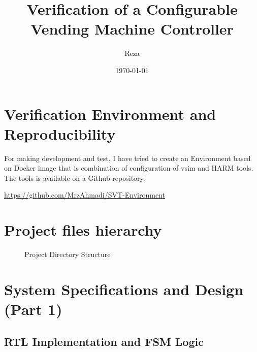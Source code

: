\documentclass[11pt]{article}
\title{Verification of a Configurable Vending Machine Controller}
\author{Reza}
\date{\today}
\begin{document}
\maketitle
\tableofcontents
\newpage

\section{Verification Environment and Reproducibility}
For making development and test, I have tried to create an Environment based on Docker image that is combination of configuration of vsim and HARM tools. The tools is available on a Github repository.
\begin{center}
    \url{https://github.com/MrzAhmadi/SVT-Environment}
\end{center}

\section{Project files hierarchy}
\begin{figure}[h]
    \centering
    \begin{minipage}{0.6\textwidth} %
    \end{minipage}
    \caption{Project Directory Structure}
    \label{fig:dir_structure}
\end{figure}

\section{System Specifications and Design (Part 1)}
\subsection{RTL Implementation and FSM Logic}
\end{document}
